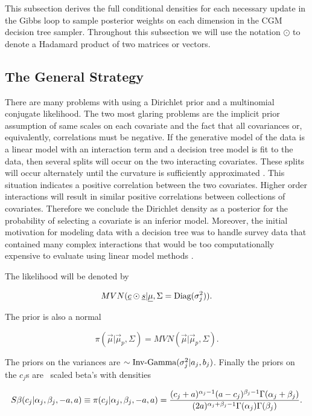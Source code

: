 This subsection derives the full conditional densities for each necessary update in the Gibbs loop to sample posterior weights on each dimension in the CGM decision tree sampler. 
 Throughout this subsection we will use the notation $\odot$ to denote a Hadamard product of two matrices or vectors. 
 
 \subsection{The General Strategy}
 There are many problems with using a Dirichlet prior and a multinomial conjugate likelihood. The two most glaring problems are the implicit prior assumption of same scales on each covariate and the fact that all covariances or, equivalently, correlations must be negative. If the generative model of the data is a linear model with an interaction term and a decision tree model is fit to the data, then several splits will occur on the two interacting covariates. These splits will occur alternately until the curvature is sufficiently approximated \cite{ishwaran2010high}. This situation indicates a positive correlation between the two covariates. Higher order interactions will result in similar positive correlations between collections of covariates. Therefore we conclude the Dirichlet density as a posterior for the probability of selecting a covariate is an inferior model. Moreover, the initial motivation for modeling data with a decision tree was to handle survey data that contained many complex interactions that would be too computationally expensive to evaluate using linear model methods \cite{morgan1963problems}. 
 
 The likelihood will be denoted by
 
 \begin{equation}\newnot{symbol:mvn}
 MVN(\vec{c}\odot\vec{s}\vert \vec{\mu}, \Sigma=\text{Diag}(\sigma^2_j)).
 \end{equation}
 
 The prior is also a normal 
 
 \begin{equation}
 \pi(\vec{\mu}\vert \vec{\mu}_p, \Sigma)=MVN(\vec{\mu}\vert \vec{\mu}_p, \Sigma).
 \end{equation}

The priors on the variances are \iid $\sim \text{Inv-Gamma}({\sigma_j^2}\vert{a_j},{b_j})$.
Finally the priors on the $c_j$s are \iid\ scaled beta's with densities 

\begin{equation}\newnot{symbol:scaled_beta}
S\beta(c_j\vert \alpha_j, \beta_j, -a, a)\equiv\pi(c_j\vert \alpha_j, \beta_j, -a, a)= \frac{(c_j+a)^{\alpha_j-1}(a-c_j)^{\beta_j-1}\Gamma(\alpha_j+\beta_j)}{(2a)^{\alpha_j+\beta_j-1}\Gamma(\alpha_j)\Gamma(\beta_j)}.
\end{equation}

